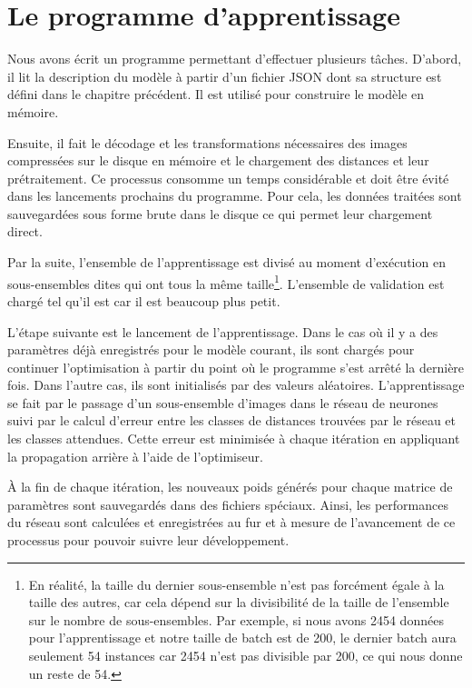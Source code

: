 \section{Le programme d'apprentissage}

Nous avons écrit un programme permettant d'effectuer plusieurs tâches.
D'abord, il lit la description du modèle à partir d'un fichier JSON dont
sa structure est défini dans le chapitre précédent. Il est utilisé pour
construire le modèle en mémoire.

Ensuite, il fait le décodage et les transformations nécessaires des images
compressées sur le disque en mémoire et le chargement des distances et leur prétraitement.
Ce processus consomme un temps considérable et doit être évité dans les lancements
prochains du programme. Pour cela, les données traitées sont sauvegardées
sous forme brute dans le disque ce qui permet leur chargement direct.

Par la suite, l'ensemble de l'apprentissage est divisé au moment d'exécution en
sous-ensembles dites  qui ont tous la même taille\footnote{
En réalité, la taille du dernier sous-ensemble n'est pas forcément égale à la
taille des autres, car cela dépend sur la divisibilité de la taille de l'ensemble
sur le nombre de sous-ensembles. Par exemple, si nous avons 2454 données pour
l'apprentissage et notre taille de batch est de 200, le dernier batch aura seulement
54 instances car 2454 n'est pas divisible par 200, ce qui nous donne un reste de 54.}.
L'ensemble de validation est chargé tel qu'il est car il est beaucoup plus petit.

L'étape suivante est le lancement de l'apprentissage. Dans le cas où il y a des
paramètres déjà enregistrés pour le modèle courant, ils sont chargés
pour continuer l'optimisation à partir du point où le programme s'est arrêté la
dernière fois. Dans l'autre cas, ils sont initialisés par des valeurs aléatoires.
L'apprentissage se fait par le passage d'un sous-ensemble d'images dans le réseau
de neurones suivi par le calcul d'erreur entre les classes de distances trouvées
par le réseau et les classes attendues. Cette erreur est minimisée à chaque
itération en appliquant la propagation arrière à l'aide de l'optimiseur.

\`A la fin de chaque itération, les nouveaux poids générés pour chaque matrice de paramètres
sont sauvegardés dans des fichiers spéciaux. Ainsi, les performances du réseau sont calculées
et enregistrées au fur et à mesure de l'avancement de ce processus pour pouvoir
suivre leur développement.

